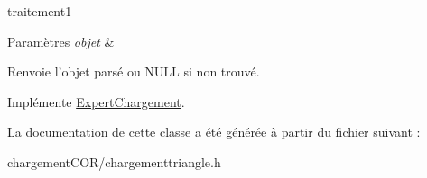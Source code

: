 traitement1 


\begin{DoxyParams}{Paramètres}
{\em objet} & \\
\hline
\end{DoxyParams}
\begin{DoxyReturn}{Renvoie}
l'objet parsé ou N\+U\+L\+L si non trouvé. 
\end{DoxyReturn}


Implémente \hyperlink{class_expert_chargement_a7d7818bdd5f0a06b06bfc8047ec8fee5}{Expert\+Chargement}.



La documentation de cette classe a été générée à partir du fichier suivant \+:\begin{DoxyCompactItemize}
\item 
chargement\+C\+O\+R/chargementtriangle.\+h\end{DoxyCompactItemize}
